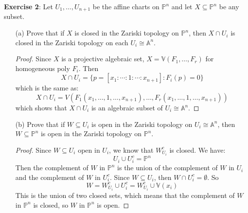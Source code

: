 \documentclass{article}
\begin{document}
\textbf{Exercise 2}: Let $U_{1}, \ldots, U_{n + 1}$ be the affine charts on $\mathbb{P}^{n}$ and let $X \subseteq \mathbb{P}^{n}$ be any subset.
    \begin{itemize}
        \item [(a)] Prove that if $X$ is closed in the Zariski topology on $\mathbb{P}^{n}$, then $X \cap U_{i}$ is closed in the Zariski topology on each $U_{i} \cong \mathbb{A}^{n}$.
            \begin{proof}
                Since $X$ is a projective algebraic set, $X = \mathbb{V}(F_{1}, \ldots, F_{r})$ for homogeneous poly $F_{i}$. Then
                    \begin{equation*}
                        X \cap U_{i} = \{p = [x_{1} : \cdots : 1 : \cdots : x_{n + 1}] : F_{i}(p) = 0 \}
                    \end{equation*}
                which is the same as:
                    \begin{equation*}
                        X \cap U_{i} = V(F_{1}(x_{1}, \ldots, 1, \ldots, x_{n + 1}), \ldots, F_{r}(x_{1}, \ldots, 1, \ldots, x_{n + 1}))
                    \end{equation*}
                which shows that $X \cap U_{i}$ is an algebraic subset of $U_{i} \cong \mathbb{A}^{n}$.
            \end{proof}

        \item [(b)] Prove that if $W \subseteq U_{i}$ is open in the Zariski topology on $U_{i} \cong \mathbb{A}^{n}$, then $W \subseteq \mathbb{P}^{n}$ is open in the Zariski topology on $\mathbb{P}^{n}$.
            \begin{proof}
                Since $W \subseteq U_{i}$ open in $U_{i}$, we know that $W_{U_{i}}^{c}$ is closed. We have:
                    \begin{equation*}
                        U_{i} \cup U_{i}^{c} = \mathbb{P}^{n}
                    \end{equation*}
                Then the complement of $W$ in $\mathbb{P}^{n}$ is the union of the complement of $W$ in $U_{i}$ and the complement of $W$ in $U_{i}^{c}$. Since $W \subseteq U_{i}$, then $W \cap U_{i}^{c} = \emptyset$. So 
                    \begin{equation*}
                        W = W_{U_{i}}^{c} \cup U_{i}^{c} = W_{U_{i}}^{c} \cup \mathbb{V}(x_{i})
                    \end{equation*}
                This is the union of two closed sets, which means that the complement of $W$ in $\mathbb{P}^{n}$ is closed, so $W$ in $\mathbb{P}^{n}$ is open.
            \end{proof}


\end{itemize}
\end{document}
